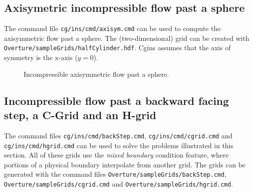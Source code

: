 \documentclass{article}
\begin{document}
\subsection{Axisymetric incompressible flow past a sphere}

The command file {\tt cg/ins/cmd/axisym.cmd} can be used to compute the axisymmetric
flow past a sphere. The (two-dimensional) grid can be created with  {\tt Overture/\-sampleGrids/\-halfCylinder.hdf}.
Cgins assumes that the axis of symmetry is the x-axis ($y=0$).


{
\begin{figure}[hbt]
\newcommand{\figWidtha}{12.cm}
\newcommand{\trimfiga}[2]{\trimPlot{#1}{#2}{.15}{.15}{.375}{.375}}
\begin{center}
\end{center} 
 \caption{Incompressible axisymmetric flow past a sphere.}
\end{figure}
}


\subsection{Incompressible flow past a backward facing step, a C-Grid and an H-grid}

The command files {\tt cg/ins/cmd/backStep.cmd}, {\tt cg/ins/cmd/cgrid.cmd} and
{\tt cg/ins/cmd/hgrid.cmd} can be used to solve the problems illustrated in this section.
All of these grids use the {\sl mixed boundary} condition feature, where portions of a 
physical boundary interpolate from another grid. The grids can be generated with the command files
{\tt Overture/sampleGrids/backStep.cmd}, {\tt Overture/sampleGrids/cgrid.cmd} and
{\tt Overture/sampleGrids/hgrid.cmd}.
\end{document}
